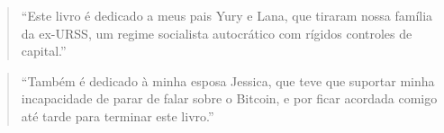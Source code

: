 \newpage \vspace*{8cm}
\thispagestyle{empty}
\begin{quotation}
\begin{center}
  \large
  \enquote{Este livro é dedicado a meus pais Yury e Lana, que tiraram nossa família da ex-URSS, um regime socialista autocrático com rígidos controles de capital.}
\end{center}
\end{quotation}
\begin{quotation}
\begin{center}
  \enquote{Também é dedicado à minha esposa Jessica, que teve que suportar minha incapacidade de parar de falar sobre o Bitcoin, e por ficar acordada comigo até tarde para terminar este livro.}
\end{center}
\end{quotation}
